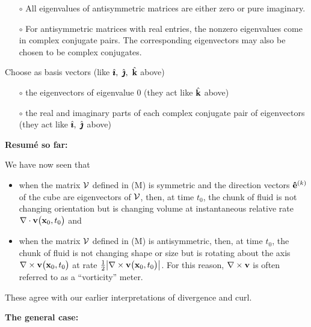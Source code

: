 \begin{itemize}\itemsep1pt \parskip0pt  %
\item[$\circ$]
 All eigenvalues of antisymmetric matrices are either zero
 or pure imaginary.
\item[$\circ$] 
For antisymmetric matrices with real entries, the nonzero
eigenvalues come in complex conjugate pairs. The corresponding eigenvectors
may also be chosen to be complex conjugates.
\end{itemize}
Choose as basis vectors (like $\hi,\ \hj,\ \hk$ above)
\begin{itemize}\itemsep1pt \parskip0pt  %
\item[$\circ$] 
the eigenvectors of eigenvalue 0 (they act like $\hat{\mathbf{k}}$ above)
\item[$\circ$] 
the real and imaginary parts of each complex conjugate pair
of eigenvectors (they act like $\hat{\pmb{\imath}},\ \hat{\pmb{\jmath}}$ above)
\end{itemize}

\noindent\textbf{Resum\'e so far:}

\noindent
We have now seen that 
\begin{itemize}\itemsep1pt \parskip0pt  %
\item
when the matrix $\mathcal{V}$ defined in (M) is symmetric and 
the direction vectors $\mathbf{\hat e}^{(k)}$ of the cube are eigenvectors of $\mathcal{V}$, then,
at time $t_0$, the chunk of fluid is not changing orientation but is changing
volume at instantaneous relative rate $\nabla\cdot\mathbf{v}\big(\mathbf{x}_0,t_0\big)$
and
\item
when the matrix $\mathcal{V}$ defined in (M) is antisymmetric, then,
at time $t_0$, the chunk of fluid is not changing shape or size but is rotating
about the axis  $\nabla\times \mathbf{v}\big(\mathbf{x}_0,t_0\big)$ at rate
$\tfrac{1}{2}\big|\nabla\times \mathbf{v}\big(\mathbf{x}_0,t_0\big)\big|$. For this reason,
$\nabla\times \mathbf{v}$ is often referred to as a ``vorticity'' meter.
\end{itemize}
These agree with our earlier interpretations of divergence and curl.


\bigskip
\noindent\textbf{The general case:}

